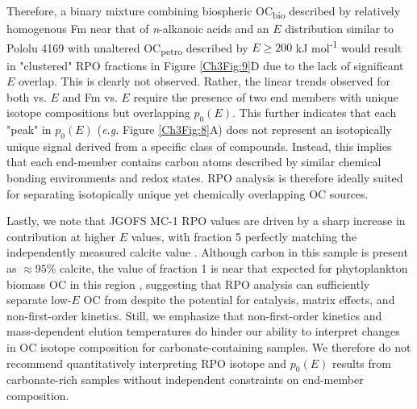 Therefore, a binary mixture combining biospheric OC\textsubscript{bio} described by relatively homogenous Fm near that of \textit{n}-alkanoic acids and an $E$ distribution similar to Pololu 4169 with unaltered OC\textsubscript{petro} described by $E \geq 200$ kJ mol\textsuperscript{-1} would result in "clustered" RPO fractions in Figure \ref{Ch3Fig:9}D due to the lack of significant $E$ overlap. This is clearly not observed. Rather, the linear trends observed for both  vs. $E$ and Fm vs. $E$ require the presence of two end members with unique isotope compositions but overlapping $p_{0}(E)$. This further indicates that each "peak" in $p_{0}(E)$ (\textit{e.g.} Figure \ref{Ch3Fig:8}A) does not represent an isotopically unique signal derived from a specific class of compounds. Instead, this implies that each end-member contains carbon atoms described by similar chemical bonding environments and redox states. RPO analysis is therefore ideally suited for separating isotopically unique yet chemically overlapping OC sources.

Lastly, we note that JGOFS MC-1 RPO  values are driven by a sharp increase in  contribution at higher $E$ values, with fraction 5 perfectly matching the independently measured calcite value \citep[Figure \ref{Ch3Fig:9}E;][]{Sayles:2001ua}. Although carbon in this sample is present as $\approx 95$\% calcite, the  value of fraction 1 is near that expected for phytoplankton biomass OC in this region \citep{Rau:1989wr}, suggesting that RPO analysis can sufficiently separate low-$E$ OC from  despite the potential for catalysis, matrix effects, and non-first-order kinetics. Still, we emphasize that non-first-order kinetics and mass-dependent  elution temperatures do hinder our ability to interpret changes in OC isotope composition for carbonate-containing samples. We therefore do not recommend quantitatively interpreting RPO isotope and $p_{0}(E)$ results from carbonate-rich samples without independent constraints on end-member composition. 









